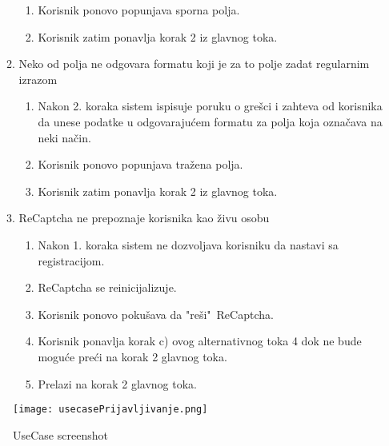\documentclass[a4paper]{article}
\begin{document}
\begin{itemize}
\begin{enumerate}
\begin{enumerate}
                    \item Korisnik ponovo popunjava sporna polja.
                    \item Korisnik zatim ponavlja korak 2 iz glavnog toka.
                \end{enumerate}
            \item Neko od polja ne odgovara formatu koji je za to polje zadat regularnim izrazom
                \begin{enumerate}
                    \item Nakon 2. koraka sistem ispisuje poruku o grešci i zahteva od korisnika da unese podatke u odgovarajućem formatu za polja koja označava na neki način.
                    \item Korisnik ponovo popunjava tražena polja.
                    \item Korisnik zatim ponavlja korak 2 iz glavnog toka.
                \end{enumerate}
            \item ReCaptcha ne prepoznaje korisnika kao živu osobu
                \begin{enumerate}
                    \item Nakon 1. koraka sistem ne dozvoljava korisniku da nastavi sa registracijom.
                    \item ReCaptcha se reinicijalizuje.
                    \item Korisnik ponovo pokušava da "reši"\ ReCaptcha.
                    \item Korisnik ponavlja korak c) ovog alternativnog toka 4 dok ne bude moguće preći na korak 2 glavnog toka.
                    \item Prelazi na korak 2 glavnog toka.
                \end{enumerate}
        \end{enumerate}
\end{itemize}

\begin{figure}
    \centering
    \texttt{[image: usecasePrijavljivanje.png]}
    \caption{UseCase screenshot}
    \label{fig:my_label}
\end{figure}
\end{document}
